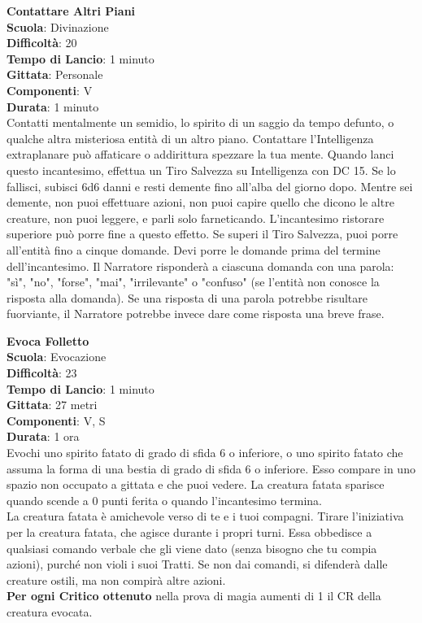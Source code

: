 \begin{multicols}{2}
\medskip\textbf{Contattare Altri Piani}\\
\textbf{Scuola}: Divinazione\\
\textbf{Difficoltà}: 20\\
\textbf{Tempo di Lancio}: 1 minuto\\
\textbf{Gittata}: Personale\\
\textbf{Componenti}: V\\
\textbf{Durata}: 1 minuto\\
Contatti mentalmente un semidio, lo spirito di un saggio da tempo defunto, o qualche altra misteriosa entità di un altro piano. Contattare l'Intelligenza extraplanare può affaticare o addirittura spezzare la tua mente. Quando lanci questo incantesimo, effettua un Tiro Salvezza su Intelligenza con DC 15. Se lo fallisci, subisci 6d6 danni e resti demente fino all'alba del giorno dopo. Mentre sei demente, non puoi effettuare azioni, non puoi capire quello che dicono le altre creature, non puoi leggere, e parli solo farneticando. L'incantesimo ristorare superiore può porre fine a questo effetto. Se superi il Tiro Salvezza, puoi porre all'entità fino a cinque domande. Devi porre le domande prima del termine dell'incantesimo. Il Narratore risponderà a ciascuna domanda con una parola: "sì", "no", "forse", "mai", "irrilevante" o "confuso" (se l'entità non conosce la risposta alla domanda). Se una risposta di una parola potrebbe risultare fuorviante, il Narratore potrebbe invece dare come risposta una breve frase.
	
\medskip\textbf{Evoca Folletto}\\
\textbf{Scuola}: Evocazione\\
\textbf{Difficoltà}: 23\\
\textbf{Tempo di Lancio}: 1 minuto\\
\textbf{Gittata}: 27 metri\\
\textbf{Componenti}: V, S\\
\textbf{Durata}: 1 ora \\
Evochi uno spirito fatato di grado di sfida 6 o inferiore, o uno spirito fatato che assuma la forma di una bestia di grado di sfida 6 o inferiore. Esso compare in uno spazio non occupato a gittata e che puoi vedere. La creatura fatata sparisce quando scende a 0 punti ferita o quando l'incantesimo termina.\\
La creatura fatata è amichevole verso di te e i tuoi compagni. Tirare l'iniziativa per la creatura fatata, che agisce durante i propri turni. Essa obbedisce a qualsiasi comando verbale che gli viene dato (senza bisogno che tu compia azioni), purché non violi i suoi Tratti. Se non dai comandi, si difenderà dalle creature ostili, ma non compirà altre azioni.\\
\textbf{Per ogni Critico ottenuto} nella prova di magia aumenti di 1 il CR della creatura evocata.


\end{multicols}
